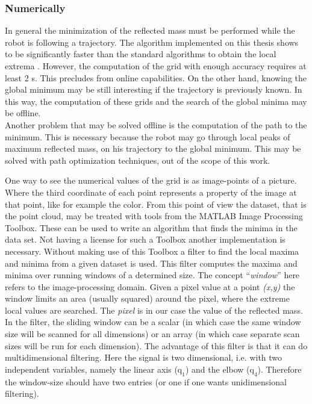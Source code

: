 \subsubsection{Numerically}
\label{sec:global_numerical}


In general the minimization of the reflected mass must be performed while the robot is following a trajectory. The algorithm  implemented on this thesis shows to be significantly faster than the standard algorithms to obtain the local extrema \cite{Lemire}. However, the computation of the grid with enough accuracy requires at least 2 s.  This precludes from online capabilities.  On the other hand, knowing the global minimum may be still interesting if the trajectory is previously known. In this way, the computation of these grids and the search of the global minima may be offline.\\
%
Another problem that may be solved offline is the computation of the path to the minimum. This is necessary because the robot may go through local peaks of maximum reflected mass, on his trajectory to the global minimum. This may be solved with path optimization techniques, out of the scope of this work. 

%
One way to see the numerical values of the grid is as image-points of a picture. Where the third coordinate of each point represents a property of the image at that point, like for example the color. From this point of view the dataset, that is the point cloud, may be treated with tools from the MATLAB Image Processing Toolbox. These can be used to write an algorithm that finds the minima in the data set. Not having a license for such a Toolbox another implementation is necessary.
Without making use of this Toolbox a filter \cite{minmaxfilter} to find the local maxima and minima from a given dataset is used. This filter computes the maxima and minima over running windows of a determined size. The concept “\textit{window}” here refers to the image-processing domain. Given a pixel value at a point \textit{(x,y)} the window limits an area (usually squared) around the pixel, where the extreme local values are searched. The \textit{pixel} is in our case  the value of the reflected mass.\\
%
In the filter, the sliding window can be a scalar (in which case the same window size will be scanned for all dimensions) or an array (in which case separate scan sizes will be run for each dimension). The advantage of this filter is that it can do multidimensional filtering. Here the signal is two dimensional, i.e. with two independent variables, namely the linear axis ($\mathrm{q_1}$) and the elbow ($\mathrm{q_4}$). Therefore the window-size should have two entries (or one if one wants unidimensional filtering).


